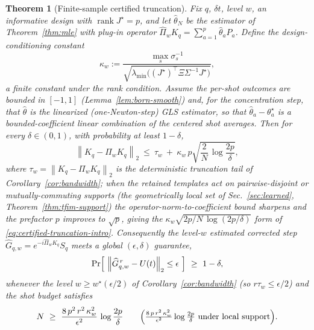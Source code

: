 \documentclass[aps,prxquantum,reprint,superscriptaddress,nofootinbib,amsmath,amssymb]{revtex4-2}
\newcommand{\norm}[1]{\left\lVert #1 \right\rVert}
\newcommand{\dt}{\delta t}
\newtheorem{theorem}{Theorem}
\begin{document}
\begin{theorem}[Finite-sample certified truncation]
\label{thm:certified-truncation}
Fix $q$, $\dt$, level $w$, an informative design with $\operatorname{rank}J^\star=p$, and let $\hat\theta_N$ be the estimator of Theorem~\ref{thm:mle} with plug-in operator $\widehat\Pi_wK_q=\sum_{a=1}^{p}\hat\theta_aP_a$. Define the design-conditioning constant
\begin{equation}
    \kappa_w:=\frac{\max_s\sigma_s^{-1}}{\sqrt{\lambda_{\min}\!\bigl((J^\star)^\top\Xi\Sigma^{-1}J^\star\bigr)}},
    \label{eq:kappa}
\end{equation}
a finite constant under the rank condition. Assume the per-shot outcomes are bounded in $[-1,1]$ (Lemma~\ref{lem:born-smooth}) and, for the concentration step, that $\hat\theta$ is the linearized (one-Newton-step) GLS estimator, so that $\hat\theta_a-\theta_a^\star$ is a bounded-coefficient linear combination of the centered shot averages. Then for every $\delta\in(0,1)$, with probability at least $1-\delta$,
\begin{equation}
    \norm{K_q-\widehat\Pi_wK_q}_2\ \le\ \tau_w\ +\ \kappa_w\,p\sqrt{\frac{2}{N}\,\log\frac{2p}{\delta}},
    \label{eq:certified-truncation}
\end{equation}
where $\tau_w=\norm{K_q-\Pi_wK_q}_2$ is the deterministic truncation tail of Corollary~\ref{cor:bandwidth}; when the retained templates act on pairwise-disjoint or mutually-commuting supports (the geometrically local set of Sec.~\ref{sec:learned}, Theorem~\ref{thm:tfim-support}) the operator-norm-to-coefficient bound sharpens and the prefactor $p$ improves to $\sqrt p$, giving the $\kappa_w\sqrt{2p/N\,\log(2p/\delta)}$ form of \eqref{eq:certified-truncation-intro}. Consequently the level-$w$ estimated corrected step $\widehat G_{q,w}=e^{-i\widehat\Pi_wK_q}S_q$ meets a global $(\epsilon,\delta)$ guarantee,
\begin{equation}
    \Pr\Bigl[\ \norm{\widehat G_{q,w}^{\,r}-U(t)}_2\le\epsilon\ \Bigr]\ \ge\ 1-\delta,
    \label{eq:certified-global}
\end{equation}
whenever the level $w\geq w^\star(\epsilon/2)$ of Corollary~\ref{cor:bandwidth} (so $r\tau_w\leq\epsilon/2$) and the shot budget satisfies
\begin{equation}
    N\ \geq\ \frac{8\,p^2\,r^2\,\kappa_w^2}{\epsilon^2}\,\log\frac{2p}{\delta}
    \qquad\Bigl(\tfrac{8\,p\,r^2\,\kappa_w^2}{\epsilon^2}\log\tfrac{2p}{\delta}\ \text{under local support}\Bigr).
    \label{eq:shot-budget}
\end{equation}
\end{theorem}
\end{document}
